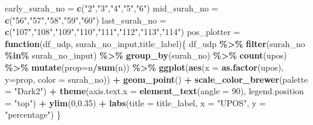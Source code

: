 \documentclass[
]{article}
\newenvironment{Shaded}{\begin{snugshade}}{\end{snugshade}}
\newcommand{\AttributeTok}[1]{\textcolor[rgb]{0.13,0.29,0.53}{#1}}
\newcommand{\ControlFlowTok}[1]{\textcolor[rgb]{0.13,0.29,0.53}{\textbf{#1}}}
\newcommand{\DecValTok}[1]{\textcolor[rgb]{0.00,0.00,0.81}{#1}}
\newcommand{\FloatTok}[1]{\textcolor[rgb]{0.00,0.00,0.81}{#1}}
\newcommand{\FunctionTok}[1]{\textcolor[rgb]{0.13,0.29,0.53}{\textbf{#1}}}
\newcommand{\NormalTok}[1]{#1}
\newcommand{\OtherTok}[1]{\textcolor[rgb]{0.56,0.35,0.01}{#1}}
\newcommand{\SpecialCharTok}[1]{\textcolor[rgb]{0.81,0.36,0.00}{\textbf{#1}}}
\newcommand{\StringTok}[1]{\textcolor[rgb]{0.31,0.60,0.02}{#1}}
\begin{document}
\begin{Shaded}
\begin{Highlighting}[]
\NormalTok{early\_surah\_no }\OtherTok{=} \FunctionTok{c}\NormalTok{(}\StringTok{"2"}\NormalTok{,}\StringTok{"3"}\NormalTok{,}\StringTok{"4"}\NormalTok{,}\StringTok{"5"}\NormalTok{,}\StringTok{"6"}\NormalTok{)}
\NormalTok{mid\_surah\_no }\OtherTok{=} \FunctionTok{c}\NormalTok{(}\StringTok{"56"}\NormalTok{,}\StringTok{"57"}\NormalTok{,}\StringTok{"58"}\NormalTok{,}\StringTok{"59"}\NormalTok{,}\StringTok{"60"}\NormalTok{)}
\NormalTok{last\_surah\_no }\OtherTok{=} \FunctionTok{c}\NormalTok{(}\StringTok{"107"}\NormalTok{,}\StringTok{"108"}\NormalTok{,}\StringTok{"109"}\NormalTok{,}\StringTok{"110"}\NormalTok{,}\StringTok{"111"}\NormalTok{,}\StringTok{"112"}\NormalTok{,}\StringTok{"113"}\NormalTok{,}\StringTok{"114"}\NormalTok{)}
\NormalTok{pos\_plotter }\OtherTok{=} \ControlFlowTok{function}\NormalTok{(df\_udp, surah\_no\_input,title\_label)\{}
\NormalTok{  df\_udp }\SpecialCharTok{\%\textgreater{}\%} \FunctionTok{filter}\NormalTok{(surah\_no }\SpecialCharTok{\%in\%}\NormalTok{ surah\_no\_input) }\SpecialCharTok{\%\textgreater{}\%} 
                \FunctionTok{group\_by}\NormalTok{(surah\_no) }\SpecialCharTok{\%\textgreater{}\%} \FunctionTok{count}\NormalTok{(upos) }\SpecialCharTok{\%\textgreater{}\%} 
                \FunctionTok{mutate}\NormalTok{(}\AttributeTok{prop=}\NormalTok{n}\SpecialCharTok{/}\FunctionTok{sum}\NormalTok{(n)) }\SpecialCharTok{\%\textgreater{}\%} 
                \FunctionTok{ggplot}\NormalTok{(}\FunctionTok{aes}\NormalTok{(}\AttributeTok{x =} \FunctionTok{as.factor}\NormalTok{(upos), }\AttributeTok{y=}\NormalTok{prop, }\AttributeTok{color =}\NormalTok{ surah\_no)) }\SpecialCharTok{+}
                  \FunctionTok{geom\_point}\NormalTok{() }\SpecialCharTok{+} \FunctionTok{scale\_color\_brewer}\NormalTok{(}\AttributeTok{palette =} \StringTok{"Dark2"}\NormalTok{) }\SpecialCharTok{+}
                  \FunctionTok{theme}\NormalTok{(}\AttributeTok{axis.text.x =} \FunctionTok{element\_text}\NormalTok{(}\AttributeTok{angle =} \DecValTok{90}\NormalTok{), }
                        \AttributeTok{legend.position =} \StringTok{"top"}\NormalTok{) }\SpecialCharTok{+}
                  \FunctionTok{ylim}\NormalTok{(}\DecValTok{0}\NormalTok{,}\FloatTok{0.35}\NormalTok{) }\SpecialCharTok{+}
                  \FunctionTok{labs}\NormalTok{(}\AttributeTok{title =}\NormalTok{ title\_label,}
                     \AttributeTok{x =} \StringTok{"UPOS"}\NormalTok{, }\AttributeTok{y =} \StringTok{"percentage"}\NormalTok{)}
\NormalTok{\}}
\end{Highlighting}
\end{Shaded}
\end{document}
